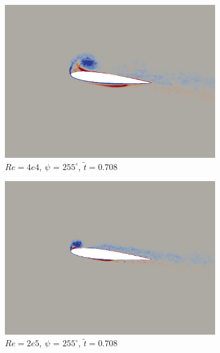 \begin{figure}[H]
	\begin{subfigure}[b]{0.32\textwidth}
		\centering
		\includegraphics[width=1\textwidth]{figures/Vorticity_plots/Re_40k_1pt0/phase_255.png}
		\caption{$Re=4e4$, $\psi$ = $255^\circ$, $\tilde{t}=0.708$}
		\label{fig:Re_40k_1pt0_phi255}
	\end{subfigure}
	\begin{subfigure}[b]{0.32\textwidth}
		\centering
		\includegraphics[width=1\textwidth]{figures/Vorticity_plots/Re_200k_1pt0/phase_255.png}
		\caption{$Re=2e5$, $\psi$ = $255^\circ$, $\tilde{t}=0.708$}
		\label{fig:Re_200k_1pt0_phi255}
	\end{subfigure}
	\begin{subfigure}[b]{0.32\textwidth}
		\centering

\end{subfigure}
\end{figure}
